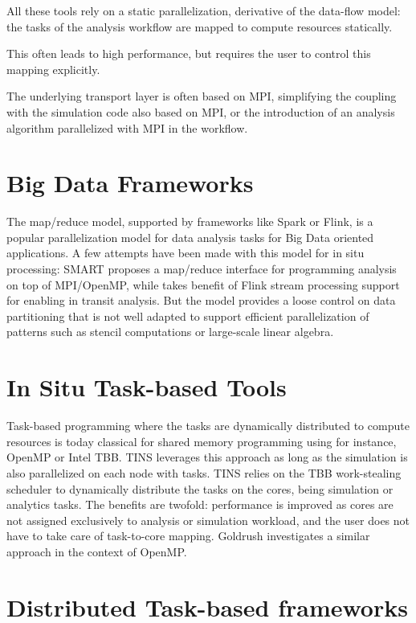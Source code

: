 All these tools rely on a static parallelization, derivative of the data-flow model: the tasks of the analysis workflow are mapped to compute resources statically.

This often leads to high performance, but requires the user to control this mapping explicitly.

The underlying transport layer is often based on MPI, simplifying the coupling with the simulation code also based on MPI, or the introduction of an analysis algorithm parallelized with MPI in the workflow.


\section{Big Data Frameworks}

The map/reduce model, supported by frameworks like Spark or Flink, is a popular parallelization model for data analysis tasks for Big Data oriented applications.
A few attempts have been made with this model for in situ processing: SMART\cite{wang_smart_2015} proposes a map/reduce interface for programming analysis on top of MPI/OpenMP, while \cite{zanuz_-transit_2018_flink} takes benefit of Flink stream processing support for enabling in transit analysis.
But the model provides a loose control on data partitioning that is not well adapted to support efficient parallelization of patterns such as stencil computations\cite{arrayUDF-SC2018} or large-scale linear algebra.


\section{In Situ Task-based Tools}
Task-based programming where the tasks are dynamically distributed to compute resources is today classical for shared memory programming using for instance, OpenMP or Intel TBB.
TINS\cite{yokota_tins_2018} leverages this approach as long as the simulation is also parallelized on each node with tasks.
TINS relies on the TBB work-stealing scheduler to dynamically distribute the tasks on the cores, being simulation or analytics tasks.
The benefits are twofold: performance is improved as cores are not assigned exclusively to analysis or simulation workload, and the user does not have to take care of task-to-core mapping.
Goldrush investigates a similar approach in the context of OpenMP\cite{zheng2013goldrush}.


\section{Distributed Task-based frameworks}

